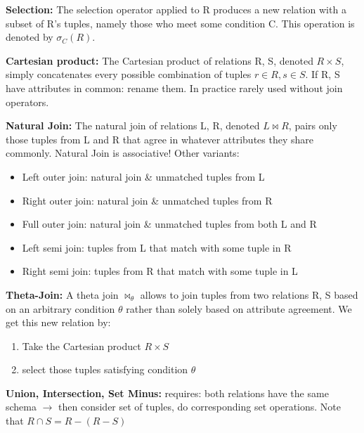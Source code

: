 \documentclass[11pt,oneside,a4paper]{article}
\begin{document}
\textbf{Selection:} The selection operator applied to R produces a new relation with a subset of R’s tuples, namely those who meet some condition C. This operation is denoted by $\sigma_C(R)$.

\textbf{Cartesian product:} The Cartesian product of relations R, S, denoted $R \times S$, simply concatenates every possible combination of tuples $r \in R, s \in S$. If R, S have attributes in common: rename them. In practice rarely used without join operators.

\textbf{Natural Join:} The natural join of relations L, R, denoted $L \bowtie R$, pairs only those tuples from L and R that agree in whatever attributes they share commonly. Natural Join is associative!
Other variants:

\vspace{-\topsep}
\begin{itemize}
	\setlength{\itemsep}{0pt}
	\setlength{\parskip}{0pt}
	\item Left outer join: natural join \& unmatched tuples from L
	\item Right outer join: natural join \& unmatched tuples from R
	\item Full outer join: natural join \& unmatched tuples from both L and R
	\item Left semi join: tuples from L that match with some tuple in R
	\item Right semi join: tuples from R that match with some tuple in L
\end{itemize}
\vspace{-\topsep}

\textbf{Theta-Join:} A theta join $\bowtie_\theta$ allows to join tuples from two relations R, S based on an arbitrary condition $\theta$ rather than solely based on attribute agreement. We get this new relation by:

\vspace{-\topsep}
\begin{enumerate}
	\setlength{\itemsep}{0pt}
	\setlength{\parskip}{0pt}
	\item Take the Cartesian product $R \times S$
	\item select those tuples satisfying condition $\theta$
\end{enumerate}
\vspace{-\topsep}

\textbf{Union, Intersection, Set Minus:} requires: both relations have the same schema $\rightarrow$ then consider set of tuples, do corresponding set operations. Note that $R \cap S = R - (R - S)$
\end{document}
